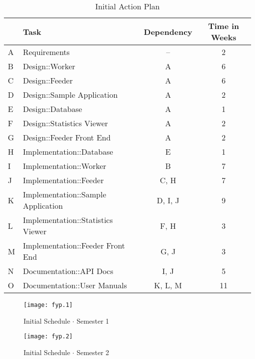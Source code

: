 \begin{table}[H]
\begin{tabularx}{\linewidth}{llcc}
\toprule
\textbf{} & \textbf{Task} & \textbf{Dependency} & \textbf{Time in Weeks} \\
\midrule
\endhead
A & Requirements                       & --      & 2  \\
B & Design::Worker                     & A       & 6  \\
C & Design::Feeder                     & A       & 6  \\
D & Design::Sample Application         & A       & 2  \\
E & Design::Database                   & A       & 1  \\
F & Design::Statistics Viewer          & A       & 2  \\
G & Design::Feeder Front End           & A       & 2  \\
H & Implementation::Database           & E       & 1  \\
I & Implementation::Worker             & B       & 7  \\
J & Implementation::Feeder             & C, H    & 7  \\
K & Implementation::Sample Application & D, I, J & 9  \\
L & Implementation::Statistics Viewer  & F, H    & 3  \\
M & Implementation::Feeder Front End   & G, J    & 3  \\
N & Documentation::API Docs            & I, J    & 5  \\
O & Documentation::User Manuals        & K, L, M & 11 \\
\bottomrule
\end{tabularx}
\caption{Initial Action Plan}
\label{tab:actionplan}
\end{table}

\begin{figure}[H]
\begin{flushleft}
\texttt{[image: fyp.1]}
\end{flushleft}
\caption{Initial Schedule $\cdot$ Semester 1}
\label{fig:gantt1}
\end{figure}

\begin{figure}[H]
\begin{flushleft}
\texttt{[image: fyp.2]}
\end{flushleft}
\caption{Initial Schedule $\cdot$ Semester 2}
\label{fig:gantt2}
\end{figure}

